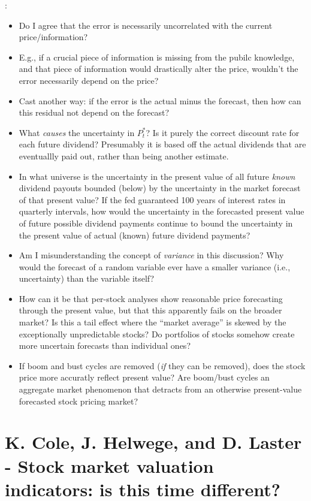 \documentclass{article}
\begin{document}
\note{[Consider]}:
\begin{itemize}
    \item Do I agree that the error is necessarily uncorrelated with the current price/information?
    \item E.g., if a crucial piece of information is missing from the pubilc knowledge, and that piece of information would drastically alter the price, wouldn't the error necessarily depend on the price?
    \item Cast another way: if the error is the actual minus the forecast, then how can this residual not depend on the forecast?
    \item What {\it causes} the uncertainty in $P_t^*$?  Is it purely the correct discount rate for each future dividend?  Presumably it is based off the actual dividends that are eventuallly paid out, rather than being another estimate.
    \item In what universe is the uncertainty in the present value of all future {\it known} dividend payouts bounded (below) by the uncertainty in the market forecast of that present value?  If the fed guaranteed 100 years of interest rates in quarterly intervals, how would the uncertainty in the forecasted present value of future possible dividend payments continue to bound the uncertainty in the present value of actual (known) future dividend payments?
    \item Am I misunderstanding the concept of {\it variance} in this discussion?  Why would the forecast of a random variable ever have a smaller variance (i.e., uncertainty) than the variable itself?
    \item How can it be that per-stock analyses show reasonable price forecasting through the present value, but that this apparently fails on the broader market?  Is this a tail effect where the ``market average'' is skewed by the exceptionally unpredictable stocks?  Do portfolios of stocks somehow create more uncertain forecasts than individual ones?
    \item If boom and bust cycles are removed ({\it if} they can be removed), does the stock price more accuratly reflect present value?  Are boom/bust cycles an aggregate market phenomenon that detracts from an otherwise present-value forecasted stock pricing market?
\end{itemize}


\section{K. Cole, J. Helwege, and D. Laster - Stock market valuation indicators: is this time different?}
\end{document}
